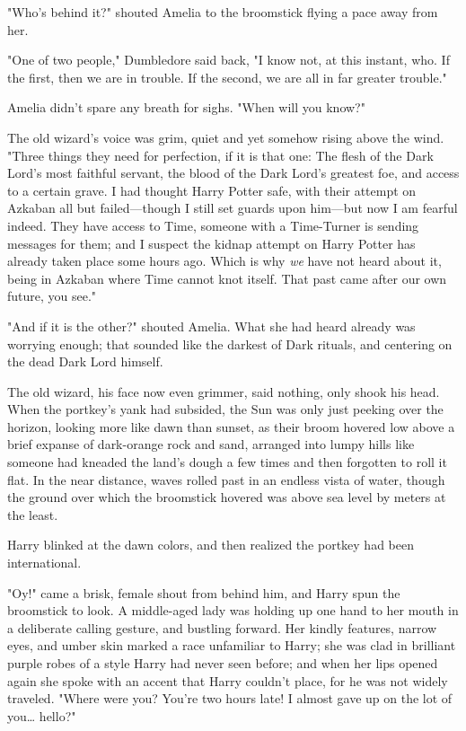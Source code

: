"Who's behind it?" shouted Amelia to the broomstick flying a pace away from her.

"One of two people," Dumbledore said back, "I know not, at this instant, who. 
If the first, then we are in trouble. If the second, we are all in far greater 
trouble."

Amelia didn't spare any breath for sighs. "When will you know?"

The old wizard's voice was grim, quiet and yet somehow rising above the wind. 
"Three things they need for perfection, if it is that one: The flesh of the 
Dark Lord's most faithful servant, the blood of the Dark Lord's greatest foe, 
and access to a certain grave. I had thought Harry Potter safe, with their 
attempt on Azkaban all but failed---though I still set guards upon him---but 
now I am fearful indeed. They have access to Time, someone with a Time-Turner 
is sending messages for them; and I suspect the kidnap attempt on Harry Potter 
has already taken place some hours ago. Which is why \emph{we} have not heard 
about it, being in Azkaban where Time cannot knot itself. That past came after 
our own future, you see."

"And if it is the other?" shouted Amelia. What she had heard already was 
worrying enough; that sounded like the darkest of Dark rituals, and centering 
on the dead Dark Lord himself.

The old wizard, his face now even grimmer, said nothing, only shook his head.
\sbreak
When the portkey's yank had subsided, the Sun was only just peeking over the 
horizon, looking more like dawn than sunset, as their broom hovered low above a 
brief expanse of dark-orange rock and sand, arranged into lumpy hills like 
someone had kneaded the land's dough a few times and then forgotten to roll it 
flat. In the near distance, waves rolled past in an endless vista of water, 
though the ground over which the broomstick hovered was above sea level by 
meters at the least.

Harry blinked at the dawn colors, and then realized the portkey had been 
international.

"Oy!" came a brisk, female shout from behind him, and Harry spun the broomstick 
to look. A middle-aged lady was holding up one hand to her mouth in a 
deliberate calling gesture, and bustling forward. Her kindly features, narrow 
eyes, and umber skin marked a race unfamiliar to Harry; she was clad in 
brilliant purple robes of a style Harry had never seen before; and when her 
lips opened again she spoke with an accent that Harry couldn't place, for he 
was not widely traveled. "Where were you? You're two hours late! I almost gave 
up on the lot of you{\ldots} hello?"

